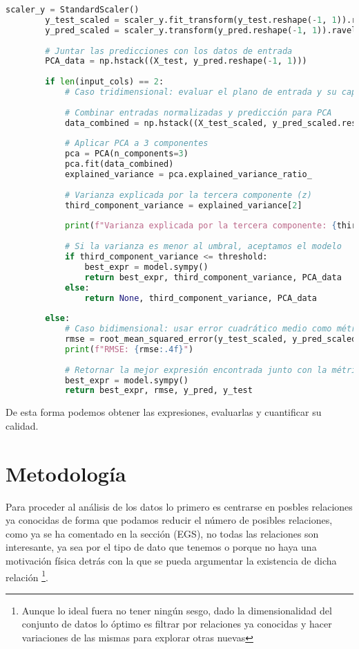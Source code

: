 \documentclass[11pt, a4paper]{article} %
\begin{document}
\begin{lstlisting}[language=Python, caption=Implementación del modelo de regresión simbólica, basicstyle=\tiny,label=lst:foo]
        scaler_y = StandardScaler()
        y_test_scaled = scaler_y.fit_transform(y_test.reshape(-1, 1)).ravel()
        y_pred_scaled = scaler_y.transform(y_pred.reshape(-1, 1)).ravel()
    
        # Juntar las predicciones con los datos de entrada
        PCA_data = np.hstack((X_test, y_pred.reshape(-1, 1)))
    
        if len(input_cols) == 2:
            # Caso tridimensional: evaluar el plano de entrada y su capacidad explicativa
    
            # Combinar entradas normalizadas y predicción para PCA
            data_combined = np.hstack((X_test_scaled, y_pred_scaled.reshape(-1, 1)))
    
            # Aplicar PCA a 3 componentes
            pca = PCA(n_components=3)
            pca.fit(data_combined)
            explained_variance = pca.explained_variance_ratio_
    
            # Varianza explicada por la tercera componente (z)
            third_component_variance = explained_variance[2]
    
            print(f"Varianza explicada por la tercera componente: {third_component_variance:.4f}")
    
            # Si la varianza es menor al umbral, aceptamos el modelo
            if third_component_variance <= threshold:
                best_expr = model.sympy()
                return best_expr, third_component_variance, PCA_data
            else:
                return None, third_component_variance, PCA_data
    
        else:
            # Caso bidimensional: usar error cuadrático medio como métrica
            rmse = root_mean_squared_error(y_test_scaled, y_pred_scaled)
            print(f"RMSE: {rmse:.4f}")
    
            # Retornar la mejor expresión encontrada junto con la métrica
            best_expr = model.sympy()
            return best_expr, rmse, y_pred, y_test
    \end{lstlisting}

De esta forma podemos obtener las expresiones, evaluarlas y cuantificar su calidad.

\section{Metodología}

Para proceder al análisis de los datos lo primero es centrarse en posbles relaciones ya conocidas de forma que podamos reducir el número de posibles relaciones, como ya se ha comentado 
en la sección (EGS), no todas las relaciones son interesante, ya sea por el tipo de dato que tenemos o porque no haya una motivación física detrás con la que se pueda argumentar la existencia de dicha relación
\footnote{Aunque lo ideal fuera no tener ningún sesgo, dado la dimensionalidad del conjunto de datos lo óptimo es filtrar por relaciones ya conocidas y hacer variaciones de las mismas para explorar otras nuevas}.
\end{document}

